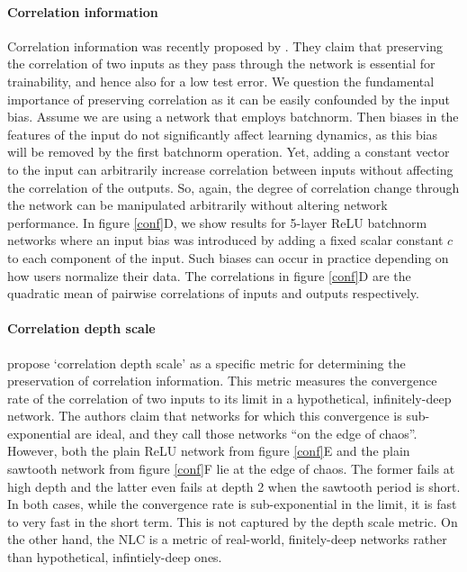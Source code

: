 \documentclass{article} %
\begin{document}
\paragraph{Correlation information}

Correlation information was recently proposed by \citet{depthScalesMeanField,resNetMeanField,meanFieldCNN,meanFieldRNN,meanFieldBN}. They claim that preserving the correlation of two inputs as they pass through the network is essential for trainability, and hence also for a low test error. We question the fundamental importance of preserving correlation as it can be easily confounded by the input bias. Assume we are using a network that employs batchnorm. Then biases in the features of the input do not significantly affect learning dynamics, as this bias will be removed by the first batchnorm operation. Yet, adding a constant vector to the input can arbitrarily increase correlation between inputs without affecting the correlation of the outputs. So, again, the degree of correlation change through the network can be manipulated arbitrarily without altering network performance. In figure \ref{conf}D, we show results for 5-layer ReLU batchnorm networks where an input bias was introduced by adding a fixed scalar constant $c$ to each component of the input. Such biases can occur in practice depending on how users normalize their data. The correlations in figure \ref{conf}D are the quadratic mean of pairwise correlations of inputs and outputs respectively.

\paragraph{Correlation depth scale} \citet{depthScalesMeanField,resNetMeanField,meanFieldCNN,meanFieldRNN,meanFieldBN} propose `correlation depth scale' as a specific metric for determining the preservation of correlation information. This metric measures the convergence rate of the correlation of two inputs to its limit in a hypothetical, infinitely-deep network. The authors claim that networks for which this convergence is sub-exponential are ideal, and they call those networks ``on the edge of chaos''. However, both the plain ReLU network from figure \ref{conf}E and the plain sawtooth network from figure \ref{conf}F lie at the edge of chaos. The former fails at high depth and the latter even fails at depth 2 when the sawtooth period is short. In both cases, while the convergence rate is sub-exponential in the limit, it is fast to very fast in the short term. This is not captured by the depth scale metric. On the other hand, the NLC is a metric of real-world, finitely-deep networks rather than hypothetical, infintiely-deep ones.
\end{document}
